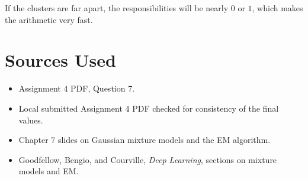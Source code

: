 \documentclass[11pt]{article}
\begin{document}
If the clusters are far apart, the responsibilities will be nearly \(0\) or \(1\),
which makes the arithmetic very fast.

\section*{Sources Used}

\begin{itemize}
    \item Assignment 4 PDF, Question 7.
    \item Local submitted Assignment 4 PDF checked for consistency of the final values.
    \item Chapter 7 slides on Gaussian mixture models and the EM algorithm.
    \item Goodfellow, Bengio, and Courville, \emph{Deep Learning}, sections on mixture models and EM.
\end{itemize}
\end{document}
